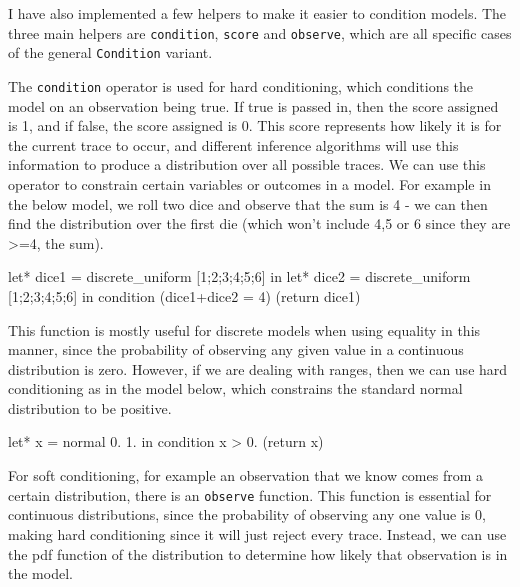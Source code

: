 I have also implemented a few helpers to make it easier to condition models. The three main helpers are \texttt{condition}, \texttt{score} and \texttt{observe}, which are all specific cases of the general \texttt{Condition} variant. 
		
The \texttt{condition} operator is used for hard conditioning, which conditions the model on an observation being true. If true is passed in, then the score assigned is 1, and if false, the score assigned is 0. This score represents how likely it is for the current trace to occur, and different inference algorithms will use this information to produce a distribution over all possible traces. We can use this operator to constrain certain variables or outcomes in a model. For example in the below model, we roll two dice and observe that the sum is 4 - we can then find the distribution over the first die (which won't include 4,5 or 6 since they are >=4, the sum).
		
\begin{ocamlcode-in}
let* dice1 = discrete_uniform [1;2;3;4;5;6] in
let* dice2 = discrete_uniform [1;2;3;4;5;6] in
condition (dice1+dice2 = 4)
	(return dice1)
\end{ocamlcode-in}
				
This function is mostly useful for discrete models when using equality in this manner, since the probability of observing any given value in a continuous distribution is zero. However, if we are dealing with ranges, then we can use hard conditioning as in the model below, which constrains the standard normal distribution to be positive.

\begin{ocamlcode-in}
	let* x = normal 0. 1. in
	condition x > 0.
		(return x)		
\end{ocamlcode-in}

For soft conditioning, for example an observation that we know comes from a certain distribution, there is an \texttt{observe} function. This function is essential for continuous distributions, since the probability of observing any one value is 0, making hard conditioning since it will just reject every trace. Instead, we can use the pdf function of the distribution to determine how likely that observation is in the model.


